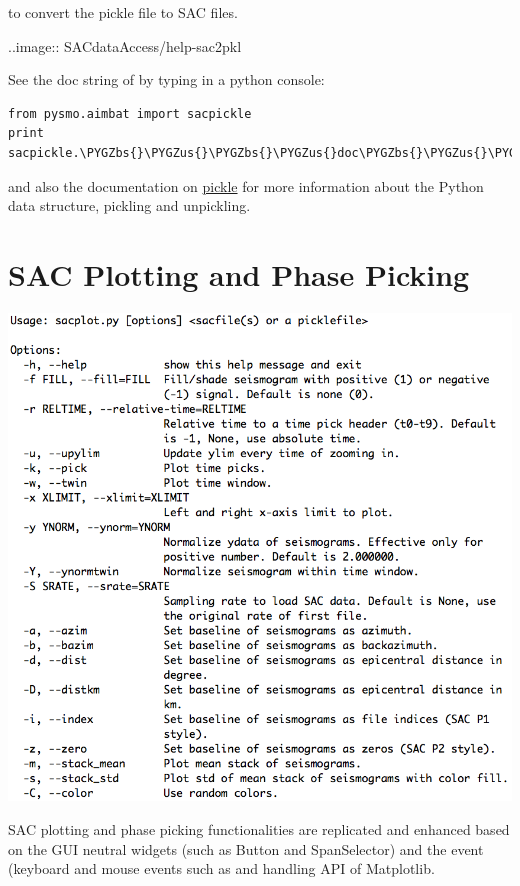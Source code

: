 \documentclass[letterpaper,10pt,english]{sphinxmanual}
\def\PYGZbs{\char`\\}
\def\PYGZus{\char`\_}
\begin{document}
to convert the pickle file to SAC files.

..image:: SACdataAccess/help-sac2pkl

See the doc string of  by typing in a python console:

\begin{Verbatim}[commandchars=\\\{\}]
from pysmo.aimbat import sacpickle
print sacpickle.\PYGZbs{}\PYGZus{}\PYGZbs{}\PYGZus{}doc\PYGZbs{}\PYGZus{}\PYGZbs{}\PYGZus{}
\end{Verbatim}

and also the documentation on \href{http://docs.python.org/library/pickle.html}{pickle} for more information about the Python data structure, pickling and unpickling.


\section{SAC Plotting and Phase Picking}
\label{docfiles/SACdataAccess:sac-plotting-and-phase-picking}
\includegraphics{help-sacplot.png}

SAC plotting and phase picking functionalities are replicated and enhanced based on the GUI neutral widgets (such as Button and SpanSelector) and the event (keyboard and mouse events such as  and  handling API of Matplotlib.
\end{document}
